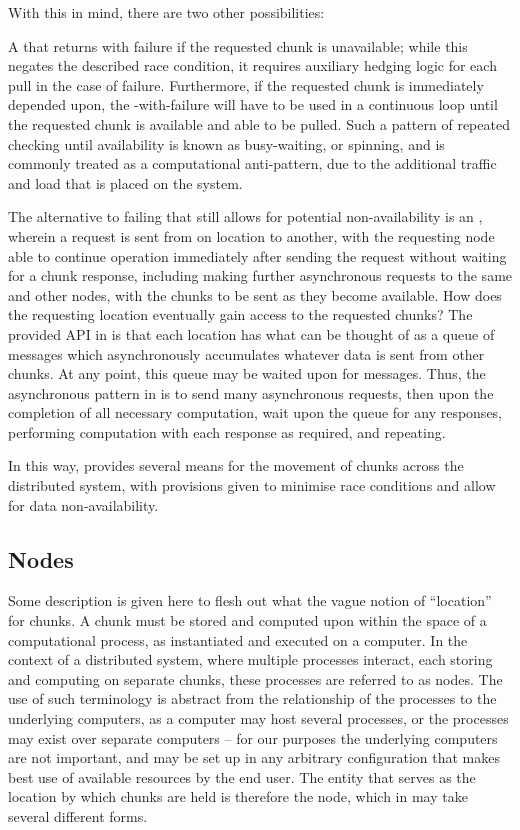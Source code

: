 With this in mind, there are two other possibilities:

A  that returns with failure if the requested chunk is unavailable; while this negates the described race condition, it requires auxiliary hedging logic for each pull in the case of failure.
Furthermore, if the requested chunk is immediately depended upon, the -with-failure will have to be used in a continuous loop until the requested chunk is available and able to be pulled.
Such a pattern of repeated checking until availability is known as busy-waiting, or spinning, and is commonly treated as a computational anti-pattern, due to the additional traffic and load that is placed on the system\cite{corbet2023}.

The alternative to failing  that still allows for potential non-availability is an , wherein a request is sent from on location to another, with the requesting node able to continue operation immediately after sending the request without waiting for a chunk response, including making further asynchronous requests to the same and other nodes, with the chunks to be sent as they become available.
How does the requesting location eventually gain access to the requested chunks?
The provided API in \lsr is that each location has what can be thought of as a queue of messages which asynchronously accumulates whatever data is sent from other chunks.
At any point, this queue may be waited upon for messages.
Thus, the asynchronous pattern in \lsr is to send many asynchronous requests, then upon the completion of all necessary computation, wait upon the queue for any responses, performing computation with each response as required, and repeating.

In this way, \lsr provides several means for the movement of chunks across the distributed system, with provisions given to minimise race conditions and allow for data non-availability.

\subsection{Nodes}\label{sec:node}

Some description is given here to flesh out what the vague notion of ``location'' for chunks.
A chunk must be stored and computed upon within the space of a computational process, as instantiated and executed on a computer.
In the context of a distributed system, where multiple processes interact, each storing and computing on separate chunks, these processes are referred to as nodes.
The use of such terminology is abstract from the relationship of the processes to the underlying computers, as a computer may host several processes, or the processes may exist over separate computers -- for our purposes the underlying computers are not important, and may be set up in any arbitrary configuration  that makes best use of available resources by the end user.
The entity that serves as the location by which chunks are held is therefore the node, which in \lsr may take several different forms.

